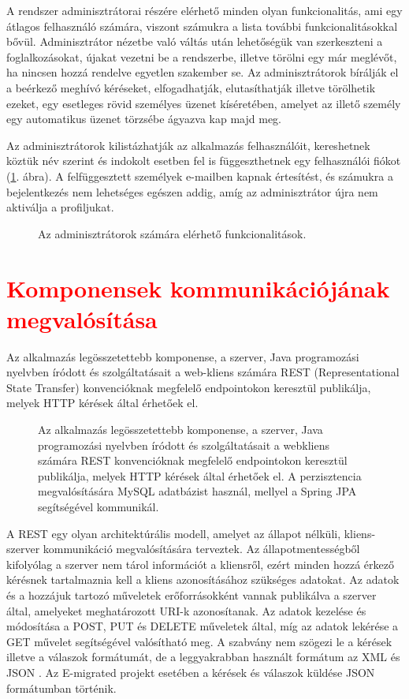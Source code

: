 A rendszer adminisztrátorai részére elérhető minden olyan funkcionalitás, ami egy átlagos felhasználó számára, viszont számukra a lista további funkcionalitásokkal bővül. Adminisztrátor nézetbe való váltás után lehetőségük van szerkeszteni a foglalkozásokat, újakat vezetni be a rendszerbe, illetve törölni egy már meglévőt, ha nincsen hozzá rendelve egyetlen szakember se. Az adminisztrátorok bírálják el a beérkező meghívó kéréseket, elfogadhatják, elutasíthatják illetve törölhetik ezeket, egy esetleges rövid személyes üzenet kíséretében, amelyet az illető személy egy automatikus üzenet törzsébe ágyazva kap majd meg. 

Az adminisztrátorok kilistázhatják az alkalmazás felhasználóit, kereshetnek köztük név szerint és indokolt esetben fel is függeszthetnek egy felhasználói fiókot (\ref{fig:admin_use_case}. ábra). A felfüggesztett személyek e-mailben kapnak értesítést, és számukra a bejelentkezés nem lehetséges egészen addig, amíg az adminisztrátor újra nem aktiválja a profiljukat. 

\begin{figure}
  \centering
  \caption{Az adminisztrátorok számára elérhető funkcionalitások.}
  \label{fig:admin_use_case}
\end{figure}

\section{\textcolor{red}{Komponensek kommunikációjának megvalósítása}}\label{sec:projektrol:kommunikacio}
Az alkalmazás legösszetettebb komponense, a szerver, Java programozási nyelvben íródott és szolgáltatásait a web-kliens számára REST (Representational State Transfer) \cite{REST} konvencióknak megfelelő endpointokon keresztül publikálja, melyek HTTP kérések által érhetőek el. 
\begin{figure}[!t]
  \centering
  \caption{Az alkalmazás legösszetettebb komponense, a szerver, Java programozási nyelvben íródott és szolgáltatásait a webkliens számára REST konvencióknak megfelelő endpointokon keresztül publikálja, melyek HTTP kérések által érhetőek el. A perzisztencia megvalósítására MySQL adatbázist használ, mellyel a Spring JPA segítségével kommunikál.}
  \label{fig:kommunikacio}
\end{figure}

A REST egy olyan architektúrális modell, amelyet az állapot nélküli, kliens-szerver kommunikáció megvalósítására terveztek. Az állapotmentességből kifolyólag a szerver nem tárol információt a kliensről, ezért minden hozzá érkező kérésnek tartalmaznia kell a kliens azonosításához szükséges adatokat. Az adatok és a hozzájuk tartozó műveletek erőforrásokként vannak publikálva a szerver által, amelyeket meghatározott URI-k azonosítanak. Az adatok kezelése és módosítása a POST, PUT és DELETE műveletek által, míg az adatok lekérése a GET művelet segítségével valósítható meg. A szabvány nem szögezi le a kérések illetve a válaszok formátumát, de a leggyakrabban használt formátum az XML és JSON \cite{REST}. Az E-migrated projekt esetében a kérések és válaszok küldése JSON formátumban történik.  

